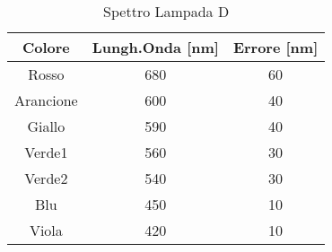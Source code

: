 \begin{table}[H]
\begin{center}
\caption{Spettro Lampada D}
\begin{tabular}{|c|c|c|}
\hline
Colore & Lungh.Onda [nm] & Errore [nm] \\ 
\hline
Rosso & 680 & 60 \\ 
Arancione & 600 & 40 \\ 
Giallo & 590 & 40 \\ 
Verde1 & 560 & 30 \\ 
Verde2 & 540 & 30 \\ 
Blu & 450 & 10 \\ 
Viola & 420 & 10 \\ 
\hline
\end{tabular}
\end{center}
\label{label}
\end{table}
